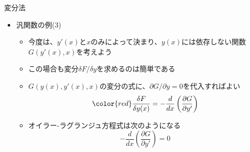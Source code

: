 \documentclass[dvipdfmx,notheorems,t]{beamer}
\begin{document}
\begin{frame}{変分法}

\begin{itemize}
	\item 汎関数の例(3)
	\begin{itemize}
		\item 今度は、$y'(x)$と$x$のみによって決まり、$y(x)$には依存しない関数\color{red}$G(y'(x), x)$\normalcolor を考えよう
		\newline
		\item この場合も変分$\delta F/\delta y$を求めるのは簡単である
		\item $G(y(x), y'(x), x)$の変分の式に、$\partial G/\partial y = 0$を代入すればよい
		\begin{equation}
			\color{red}\frac{\delta F}{\delta y(x)} = - \frac{d}{dx} \left( \frac{\partial G}{\partial y'} \right)
		\end{equation}
		
		\item オイラー-ラグランジュ方程式は次のようになる
		\begin{equation}
			- \frac{d}{dx} \left( \frac{\partial G}{\partial y'} \right) = 0
		\end{equation}
	\end{itemize}
\end{itemize}

\end{frame}
\end{document}
